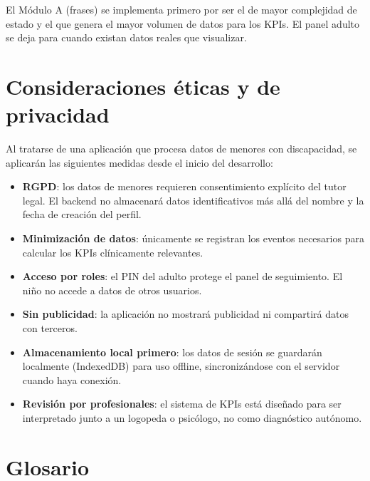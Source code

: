 \documentclass[12pt, a4paper]{article}
\begin{document}
\begin{nota}
El Módulo A (frases) se implementa primero por ser el de mayor complejidad de estado y el que genera el mayor volumen de datos para los KPIs. El panel adulto se deja para cuando existan datos reales que visualizar.
\end{nota}

\section{Consideraciones éticas y de privacidad}

Al tratarse de una aplicación que procesa datos de menores con discapacidad, se aplicarán las siguientes medidas desde el inicio del desarrollo:

\begin{itemize}
  \item \textbf{RGPD}: los datos de menores requieren consentimiento explícito del tutor legal. El backend no almacenará datos identificativos más allá del nombre y la fecha de creación del perfil.
  \item \textbf{Minimización de datos}: únicamente se registran los eventos necesarios para calcular los KPIs clínicamente relevantes.
  \item \textbf{Acceso por roles}: el PIN del adulto protege el panel de seguimiento. El niño no accede a datos de otros usuarios.
  \item \textbf{Sin publicidad}: la aplicación no mostrará publicidad ni compartirá datos con terceros.
  \item \textbf{Almacenamiento local primero}: los datos de sesión se guardarán localmente (IndexedDB) para uso offline, sincronizándose con el servidor cuando haya conexión.
  \item \textbf{Revisión por profesionales}: el sistema de KPIs está diseñado para ser interpretado junto a un logopeda o psicólogo, no como diagnóstico autónomo.
\end{itemize}

\section{Glosario}
\end{document}
